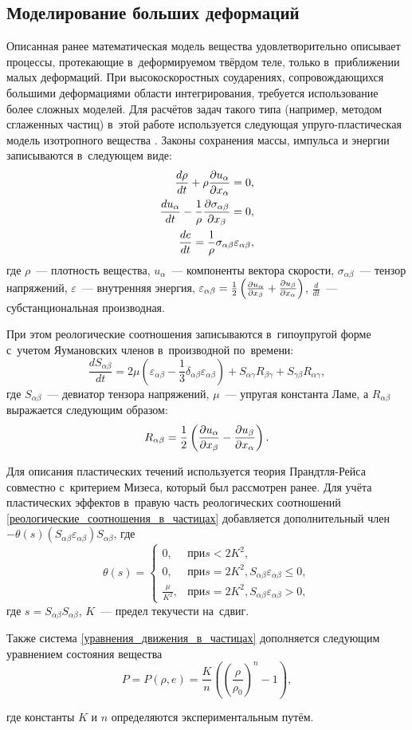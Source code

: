 \documentclass[thesis.tex]{subfiles}
\begin{document}
\subsection{Моделирование больших деформаций}
Описанная ранее математическая модель вещества удовлетворительно описывает процессы, протекающие в~деформируемом твёрдом
теле, только в~приближении малых деформаций. При высокоскоростных соударениях, сопровождающихся большими деформациями
области интегрирования, требуется использование более сложных моделей. Для расчётов задач такого типа (например, методом
сглаженных частиц) в~этой работе используется следующая упруго-пластическая модель изотропного вещества \cite{потапов2009диссертация}.
Законы сохранения массы, импульса и энергии записываются в~следующем виде:
\begin{align}
    \label{уравнения_движения_в_частицах}
    \frac{d\rho}{dt} + \rho \frac{\partial{u_\alpha}}{\partial{x_\alpha}} = 0, \nonumber \\
    \frac{du_\alpha}{dt}-\frac{1}{\rho}\frac{\partial{\sigma_{\alpha\beta}}}{\partial{x_\beta}} = 0, \\
    \frac{de}{dt} = \frac{1}{\rho}\sigma_{\alpha\beta}\varepsilon_{\alpha\beta}, \nonumber
\end{align}
где $\rho$~--- плотность вещества, $u_\alpha$~--- компоненты вектора скорости, $\sigma_{\alpha\beta}$~--- тензор напряжений,
$\varepsilon$~--- внутренняя энергия, $\varepsilon_{\alpha\beta}=\frac{1}{2}\left( \frac{\partial{u_\alpha}}{\partial{x_\beta}} + \frac{\partial{u_\beta}}{\partial{x_\alpha}}\right)$,
$\frac{d}{dt}$~--- субстанциональная производная.

При этом реологические соотношения записываются в~гипоупругой форме с~учетом Яумановских членов в~производной по~времени:
\begin{equation}
    \label{реологические_соотношения_в_частицах}
    \frac{dS_{\alpha\beta}}{dt} = 2\mu \left( \varepsilon_{\alpha\beta}-\frac{1}{3}\delta_{\alpha\beta}\varepsilon_{\alpha\beta} \right) +
                                  S_{\alpha\gamma}R_{\beta\gamma}+S_{\gamma\beta}R_{\alpha\gamma},
\end{equation}
где $S_{\alpha\beta}$~--- девиатор тензора напряжений, $\mu$~--- упругая константа Ламе, а $R_{\alpha\beta}$ выражается следующим образом:
\[
    R_{\alpha\beta} = \frac{1}{2}\left( \frac{\partial{u_\alpha}}{\partial{x_\beta}} - \frac{\partial{u_\beta}}{\partial{x_\alpha}}\right).
\]

Для описания пластических течений используется теория Прандтля-Рейса совместно с~критерием Мизеса, который был
рассмотрен ранее. Для учёта пластических эффектов в~правую часть реологических соотношений
\eqref{реологические_соотношения_в_частицах} добавляется дополнительный член
$-\theta(s)(S_{\alpha\beta}\varepsilon_{\alpha\beta})S_ {\alpha\beta}$, где
\[
    \theta(s)=\left\{\begin{aligned}
        0, & при s<2K^2, \nonumber \\
        0, & при s=2K^2, S_{\alpha\beta}\varepsilon_{\alpha\beta} \leq 0, \nonumber \\
        \frac{\mu}{K^2}, & при s=2K^2, S_{\alpha\beta}\varepsilon_{\alpha\beta} > 0, \nonumber
    \end{aligned}\right.
\]
где $s=S_{\alpha\beta}S_{\alpha\beta}$, $K$~--- предел текучести на~сдвиг.

Также система \eqref{уравнения_движения_в_частицах} дополняется следующим уравнением состояния вещества \cite{monaghan1988introduction}
\[
    P = P(\rho,e) = \frac{K}{n}\left( \left( \frac{\rho}{\rho_0} \right)^n -1  \right),
\]

где константы $K$ и $n$ определяются экспериментальным путём.
\end{document}
